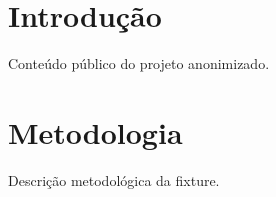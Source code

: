 \documentclass{abntexto-ufc}
\begin{document}
\pretextual

\ufcPrintCover
\ufcPrintTitlePage
{}
\ufcPrintTableOfContents

\textual
\section{Introdução}
Conteúdo público do projeto anonimizado.

\section{Metodologia}
Descrição metodológica da fixture.
\end{document}
